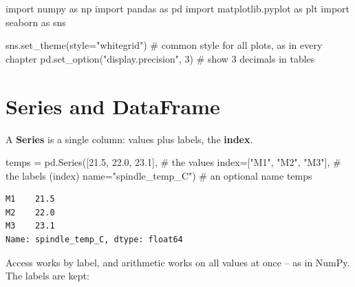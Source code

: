 \documentclass[
  letterpaper,
  DIV=11,
  numbers=noendperiod]{scrreprt}
\newenvironment{Shaded}{\begin{snugshade}}{\end{snugshade}}
\newcommand{\CommentTok}[1]{\textcolor[rgb]{0.37,0.37,0.37}{#1}}
\newcommand{\DecValTok}[1]{\textcolor[rgb]{0.68,0.00,0.00}{#1}}
\newcommand{\FloatTok}[1]{\textcolor[rgb]{0.68,0.00,0.00}{#1}}
\newcommand{\ImportTok}[1]{\textcolor[rgb]{0.00,0.46,0.62}{#1}}
\newcommand{\NormalTok}[1]{\textcolor[rgb]{0.00,0.23,0.31}{#1}}
\newcommand{\OperatorTok}[1]{\textcolor[rgb]{0.37,0.37,0.37}{#1}}
\newcommand{\StringTok}[1]{\textcolor[rgb]{0.13,0.47,0.30}{#1}}
\begin{document}
\begin{Shaded}
\begin{Highlighting}[]
\ImportTok{import}\NormalTok{ numpy }\ImportTok{as}\NormalTok{ np}
\ImportTok{import}\NormalTok{ pandas }\ImportTok{as}\NormalTok{ pd}
\ImportTok{import}\NormalTok{ matplotlib.pyplot }\ImportTok{as}\NormalTok{ plt}
\ImportTok{import}\NormalTok{ seaborn }\ImportTok{as}\NormalTok{ sns}

\NormalTok{sns.set\_theme(style}\OperatorTok{=}\StringTok{"whitegrid"}\NormalTok{)             }\CommentTok{\# common style for all plots, as in every chapter}
\NormalTok{pd.set\_option(}\StringTok{"display.precision"}\NormalTok{, }\DecValTok{3}\NormalTok{)        }\CommentTok{\# show 3 decimals in tables}
\end{Highlighting}
\end{Shaded}

\section*{Series and DataFrame}\label{series-and-dataframe}


A \textbf{Series} is a single column: values plus labels, the
\textbf{index}.

\begin{Shaded}
\begin{Highlighting}[]
\NormalTok{temps }\OperatorTok{=}\NormalTok{ pd.Series([}\FloatTok{21.5}\NormalTok{, }\FloatTok{22.0}\NormalTok{, }\FloatTok{23.1}\NormalTok{],                    }\CommentTok{\# the values}
\NormalTok{                  index}\OperatorTok{=}\NormalTok{[}\StringTok{"M1"}\NormalTok{, }\StringTok{"M2"}\NormalTok{, }\StringTok{"M3"}\NormalTok{],              }\CommentTok{\# the labels (index)}
\NormalTok{                  name}\OperatorTok{=}\StringTok{"spindle\_temp\_C"}\NormalTok{)                 }\CommentTok{\# an optional name}
\NormalTok{temps}
\end{Highlighting}
\end{Shaded}

\begin{verbatim}
M1    21.5
M2    22.0
M3    23.1
Name: spindle_temp_C, dtype: float64
\end{verbatim}

Access works by label, and arithmetic works on all values at once -- as
in NumPy. The labels are kept:
\end{document}
